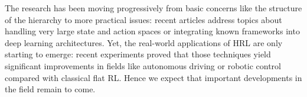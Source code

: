 \documentclass{article}
\begin{document}
The research has been moving progressively from basic concerns like the structure of the hierarchy to more practical issues: recent articles address topics about handling very large state and action spaces or integrating known frameworks into deep learning architectures. Yet, the real-world applications of HRL are only starting to emerge: recent experiments proved that those techniques yield significant improvements in fields like autonomous driving or robotic control compared with classical flat RL. Hence we expect that important developments in the field remain to come.

\small

\setlength{\bibsep}{2.5pt}

\end{document}
